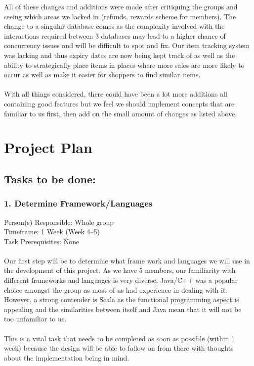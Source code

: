 All of these changes and additions were made after critiquing the groups and seeing which areas we lacked in (refunds, rewards scheme for members). The change to a singular database comes as the complexity involved with the interactions required between 3 databases may lead to a higher chance of concurrency issues and will be difficult to spot and fix. Our item tracking system was lacking and thus expiry dates are now being kept track of as well as the ability to strategically place items in places where more sales are more likely to occur as well as make it easier for shoppers to find similar items.
 \\ \\ With all things considered, there could have been a lot more additions all containing good features but we feel we should implement concepts that are familiar to us first, then add on the small amount of changes as listed above.

\chapter{Project Plan}
\label{projectplan}

\section{Tasks to be done:}
\label{taskstobedone:}

\subsection{1. Determine Framework\slash Languages}
\label{determineframeworklanguages}

Person(s) Responsible: Whole group
 \\ Timeframe: 1 Week (Week 4--5)
 \\ Task Prerequisites: None
 \\ \\ Our first step will be to determine what frame work and languages we will use in the development of this project. As we have 5 members, our familiarity with different frameworks and languages is very diverse. Java\slash C++ was a popular choice amongst the group as most of us had experience in dealing with it. However, a strong contender is Scala as the functional programming aspect is appealing and the similarities between itself and Java mean that it will not be too unfamiliar to us.
 \\ \\ This is a vital task that needs to be completed as soon as possible (within 1 week) because the design will be able to follow on from there with thoughts about the implementation being in mind.

